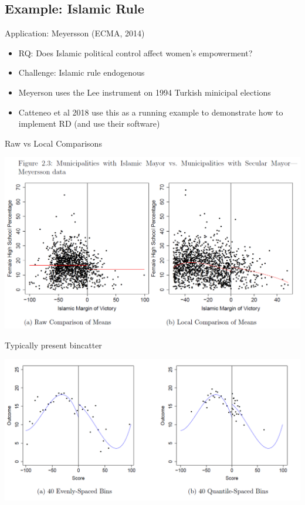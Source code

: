 \subsection{Example: Islamic Rule}

\begin{frame}{Application: Meyersson (ECMA, 2014) }
  \begin{itemize}
  \item RQ: Does Islamic political control affect women's empowerment? 
  \item Challenge: Islamic rule endogenous 
  \item Meyerson uses the Lee instrument on 1994 Turkish minicipal elections 
  \item Catteneo et al 2018 use this as a running example to demonstrate how to implement RD (and use their software)
  \end{itemize}
\end{frame}
  
\begin{frame}{Raw vs Local Comparisons}
  \begin{center}
  \includegraphics[height=0.8\textheight]{./resources/CatteneoRawScatter}
  \end{center}
\end{frame}

\begin{frame}{Typically present bincatter}
  \begin{center}
  \includegraphics[width=\textwidth]{./resources/CatteneoBinscatter}
  \end{center}
\end{frame}

